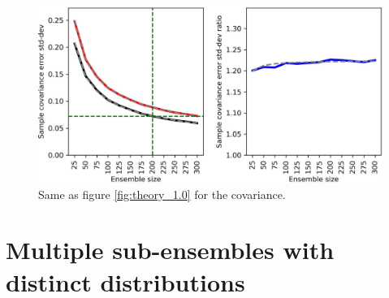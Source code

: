\documentclass[12pt]{scrartcl}
\begin{document}
\begin{figure}[h!]
  \noindent\includegraphics[width=\textwidth]{theory_0.2.jpg}
  \caption{Same as figure \ref{fig:theory_1.0} for the covariance.} \label{fig:theory_0.2}
\end{figure}

\clearpage

\section{Multiple sub-ensembles with distinct distributions}
\end{document}
